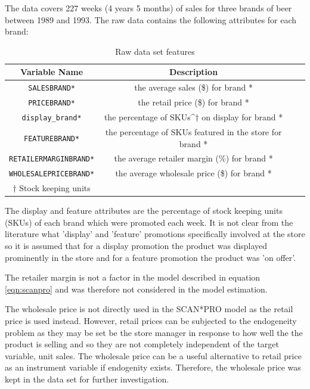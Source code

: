 \documentclass[a4paper,11pt]{article}
\begin{document}
The data covers 227 weeks (4 years 5 months) of sales for three brands of beer between 1989 and 1993. The raw data contains the following attributes for each brand:

\begin{table}[htb]
 \centering
 \caption{Raw data set features}\label{tab:data_features}
 \begin{tabular}{cccc}
 \toprule
  Variable Name & Description \\
  \midrule
  \texttt{SALESBRAND*}& the average sales (\$) for brand * \\
  \texttt{PRICEBRAND*}	& the retail price (\$) for brand * \\
  \texttt{display\_brand*}	& the percentage of SKUs^{$\dagger$} on display for brand * \\
  \texttt{FEATUREBRAND*}	& the percentage of SKUs featured in the store for brand * \\
  \texttt{RETAILERMARGINBRAND*} & the average retailer margin (\%) for brand * \\
  \texttt{WHOLESALEPRICEBRAND*} & the average wholesale price (\$) for brand * \\
  \bottomrule
  $\dagger$ Stock keeping units
  
 \end{tabular}
\end{table}

The display and feature attributes are the percentage of stock keeping units (SKUs) of each brand which were promoted each week. It is not clear from the literature \citep{srinivasan_promotions_2004} what 'display' and 'feature' promotions specifically involved at the store so it is assumed that for a display promotion the product was displayed prominently in the store and for a feature promotion the product was 'on offer'. 

The retailer margin is not a factor in the model described in equation \ref{eqn:scanpro} and was therefore not considered in the model estimation.

The wholesale price is not directly used in the SCAN*PRO model as the retail price is used instead. However, retail prices can be subjected to the endogeneity problem as they may be set be the store manager in response to how well the the product is selling and so they are not completely independent of the target variable, unit sales. The wholesale price can be a useful alternative to retail price as an instrument variable if endogenity exists. Therefore, the wholesale price was kept in the data set for further investigation.
\end{document}
